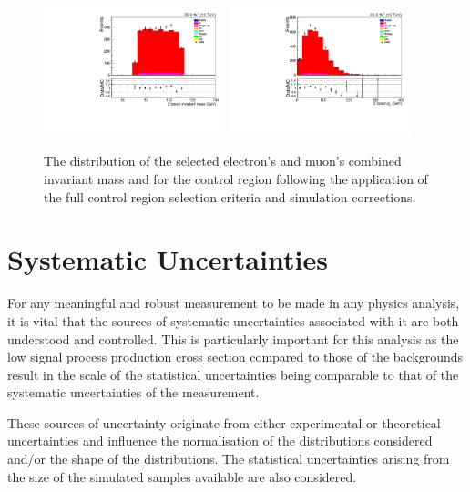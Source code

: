 \begin{figure}[htbp]
\centering
\includegraphics[width=0.47\textwidth]{figs/background-estimation/plots/unblinded/ttbar_control/zPairMass_SingleTop_wMass_emu.pdf}
\includegraphics[width=0.47\textwidth]{figs/background-estimation/plots/unblinded/ttbar_control/zPairPt_SingleTop_wMass_emu.pdf}
\caption{
The distribution of the selected electron's and muon's combined invariant mass and \pt for the \ttbar control region following the application of the full control region selection criteria and simulation corrections.
}
\label{fig:ttbarCR_leptons}
\end{figure}


\section{Systematic Uncertainties}\label{sec:systematics}
For any meaningful and robust measurement to be made in any physics analysis, it is vital that the sources of systematic uncertainties associated with it are both understood and controlled.
This is particularly important for this analysis as the low signal process production cross section compared to those of the backgrounds result in the scale of the statistical uncertainties being comparable to that of the systematic uncertainties of the measurement.

These sources of uncertainty originate from either experimental or theoretical uncertainties and influence the normalisation of the distributions considered and/or the shape of the distributions.
The statistical uncertainties arising from the size of the simulated samples available are also considered.

